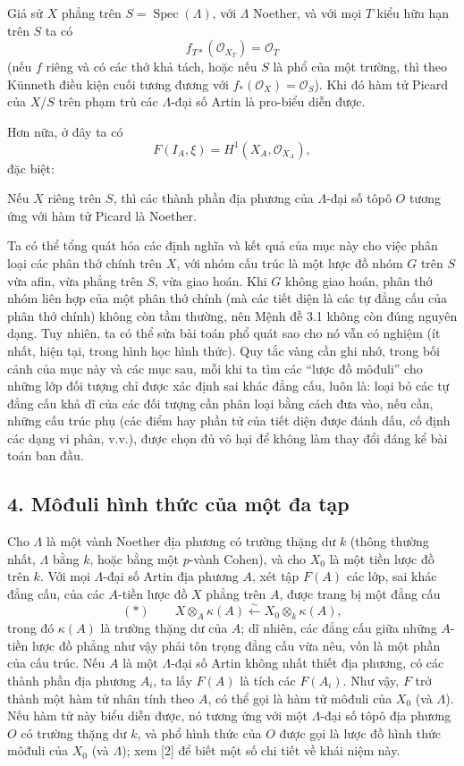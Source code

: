  Giả sử $X$ phẳng trên
$S=\operatorname{Spec}(\Lambda)$, với $\Lambda$ Noether, và với mọi $T$ kiểu
hữu hạn trên $S$ ta có
\[
  f_{T*}(\mathcal O_{X_T})=\mathcal O_T
\]
(nếu $f$ riêng và có các thớ khả tách, hoặc nếu $S$ là phổ của một trường,
thì theo Künneth điều kiện cuối tương đương với
$f_*(\mathcal O_X)=\mathcal O_S$). Khi đó hàm tử Picard của $X/S$ trên phạm
trù các $\Lambda$-đại số Artin là pro-biểu diễn được.

Hơn nữa, ở đây ta có
\[
  F(I_A,\xi)=H^1(X_A,\mathcal O_{X_A}),
\]
đặc biệt:

 Nếu $X$ riêng trên $S$, thì các thành phần địa phương của
$\Lambda$-đại số tôpô $O$ tương ứng với hàm tử Picard là Noether.

 Ta có thể tổng quát hóa các định nghĩa và kết quả của mục
này cho việc phân loại các phân thớ chính trên $X$, với nhóm cấu trúc là một
lược đồ nhóm $G$ trên $S$ vừa afin, vừa phẳng trên $S$, vừa giao hoán. Khi $G$
không giao hoán, phân thớ nhóm liên hợp của một phân thớ chính (mà các tiết
diện là các tự đẳng cấu của phân thớ chính) không còn tầm thường, nên Mệnh đề
3.1 không còn đúng nguyên dạng. Tuy nhiên, ta có thể sửa bài toán phổ quát sao
cho nó vẫn có nghiệm (ít nhất, hiện tại, trong hình học hình thức). Quy tắc
vàng cần ghi nhớ, trong bối cảnh của mục này và các mục sau, mỗi khi
ta tìm các ``lược đồ môđuli'' cho những lớp đối tượng chỉ được xác định sai
khác đẳng cấu, luôn là: loại bỏ các tự đẳng cấu khả dĩ của các đối tượng cần
phân loại bằng cách đưa vào, nếu cần, những cấu trúc phụ (các điểm hay phần tử
của tiết diện được đánh dấu, cố định các dạng vi phân, v.v.), được chọn đủ vô
hại để không làm thay đổi đáng kể bài toán ban đầu.

\subsection*{4. Môđuli hình thức của một đa tạp}

Cho $\Lambda$ là một vành Noether địa phương có trường thặng dư $k$ (thông
thường nhất, $\Lambda$ bằng $k$, hoặc bằng một $p$-vành Cohen), và cho $X_0$
là một tiền lược đồ trên $k$. Với mọi $\Lambda$-đại số Artin địa phương $A$,
xét tập $F(A)$ các lớp, sai khác đẳng cấu, của các $A$-tiền lược đồ $X$ phẳng
trên $A$, được trang bị một đẳng cấu
\[
  (*)\qquad
  X\otimes_A\kappa(A)\xleftarrow{\sim}
  X_0\otimes_k\kappa(A),
\]
trong đó $\kappa(A)$ là trường thặng dư của $A$; dĩ nhiên, các đẳng cấu giữa
những $A$-tiền lược đồ phẳng như vậy phải tôn trọng đẳng cấu vừa nêu, vốn là
một phần của cấu trúc. Nếu $A$ là một $\Lambda$-đại số Artin không nhất thiết
địa phương, có các thành phần địa phương $A_i$, ta lấy $F(A)$ là tích các
$F(A_i)$. Như vậy, $F$ trở thành một hàm tử nhân tính theo $A$, có thể gọi là
hàm tử môđuli của $X_0$ (và $\Lambda$). Nếu hàm tử này biểu diễn được, nó tương
ứng với một $\Lambda$-đại số tôpô địa phương $O$ có trường thặng dư $k$, và
phổ hình thức của $O$ được gọi là lược đồ hình thức môđuli của $X_0$ (và
$\Lambda$); xem [2] để biết một số chi tiết về khái niệm này.

